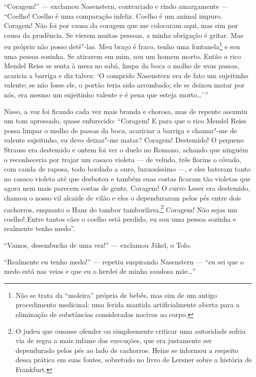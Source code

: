 ``Coragem!'' --- exclamou Nasenstern, contrariado e rindo amargamente ---
``Coelho! Coelho é uma comparação infeliz. Coelho é um animal impuro.
Coragem! Não foi por causa da coragem que me colocaram aqui, mas sim
por causa da prudência. Se vierem muitas pessoas, a minha obrigação é
gritar. Mas eu próprio não posso detê"-las. Meu braço é fraco, tenho
uma fontanela\footnote{
Não se trata da ``moleira'' própria de bebês, mas sim de um antigo
procedimento medicinal: uma ferida mantida artificialmente aberta para
a eliminação de substâncias consideradas nocivas ao corpo.}
 e sou uma pessoa sozinha. Se atirarem em mim, sou um homem morto. Então
o rico Mendel Reiss se senta à mesa no sabá, limpa da boca o molho de
uvas passas, acaricia a barriga e diz talvez: ‘O comprido Nasenstern
era de fato um sujeitinho valente; se não fosse ele, o portão teria
sido arrombado; ele se deixou matar por nós, era mesmo um sujeitinho
valente e é pena que esteja morto\ldots{}'\,''

Nisso, a voz foi ficando cada vez mais branda e chorosa, mas de repente
assumiu um tom apressado, quase enfurecido: ``Coragem! E para que o rico
Mendel Reiss possa limpar o molho de passas da boca, acariciar a
barriga e chamar"-me de valente sujeitinho, eu devo deixar"-me matar?
Coragem! Destemido! O pequeno Strauss era destemido e ontem foi ver o
duelo no Romano, achando que ninguém o reconheceria por trajar um
casaco violeta --- de veludo, três florins o côvado, com cauda de raposa,
todo bordado a ouro, luxuosíssimo ---, e eles bateram tanto no casaco
violeta até que desbotou e também suas costas ficaram tão violetas que
agora nem mais parecem costas de gente. Coragem! O curvo Leser era
destemido, chamou o nosso vil alcaide de vilão e eles o dependuraram
pelos pés entre dois cachorros, enquanto o Hans do tambor
tamborilava.\footnote{ O
judeu que ousasse ofender ou simplesmente criticar uma autoridade
sofria via de regra a mais infame das execuções, que era justamente ser
dependurado pelos pés ao lado de cachorros. Heine se informou a
respeito dessa prática em suas fontes, sobretudo no livro de Lersner
sobre a história de Frankfurt.}
 Coragem! Não sejas um coelho! Entre tantos cães o coelho está perdido,
eu sou uma pessoa sozinha e realmente tenho medo''.

``Vamos, desembucha de uma vez!'' --- exclamou Jäkel, o Tolo.

``Realmente eu tenho medo!'' --- repetiu suspirando Nasenstern --- ``eu sei que
o medo está nas veias e que eu o herdei de minha saudosa mãe\ldots''

